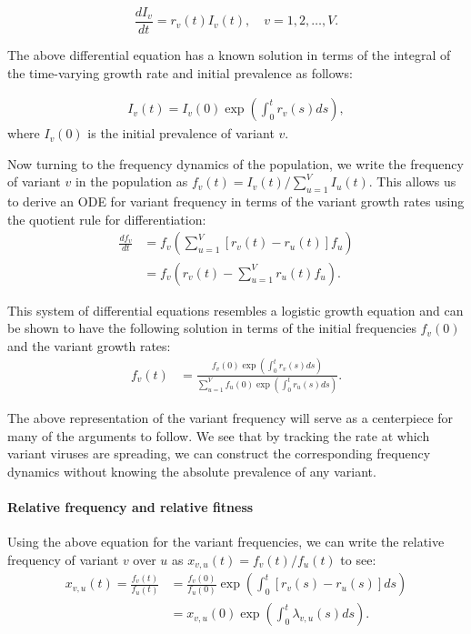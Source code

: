 \documentclass[11pt,oneside,letterpaper]{article}
\begin{document}
\begin{equation} \label{eq:inhomo_exp_growth}
    \frac{d I_{v}}{d t} = r_{v}(t) I_{v}(t), \quad v = 1,2, \ldots, V.
\end{equation}

The above differential equation has a known solution in terms of the integral of the time-varying growth rate and initial prevalence as follows:

\begin{align*}
I_{v}(t) = I_{v}(0) \exp\left( \int_{0}^{t} r_{v}(s) ds\right),
\end{align*}
where $I_{v}(0)$ is the initial prevalence of variant $v$.

Now turning to the frequency dynamics of the population, we write the frequency of variant $v$ in the population as  $f_{v}(t) = I_{v}(t) / \sum_{u=1}^{V} I_{u}(t)$.
This allows us to derive an ODE for variant frequency in terms of the variant growth rates using the quotient rule for differentiation:
\begin{align*}
    \frac{d f_{v}}{d t} &= f_{v} \left( \sum_{u=1}^{V} [r_{v}(t) - r_{u}(t)] f_{u} \right)\\
                        &= f_{v} \left( r_{v}(t) - \sum_{u=1}^{V} r_{u}(t) f_{u} \right).
\end{align*}

This system of differential equations resembles a logistic growth equation and can be shown to have the following solution in terms of the initial frequencies $f_{v}(0)$ and the variant growth rates:
\begin{align}
    f_{v}(t) &= \frac{ f_{v}(0) \exp( \int_{0}^{t} r_{v}(s) ds)}{\sum_{u=1}^{V}  f_{u}(0) \exp( \int_{0}^{t} r_{u}(s) ds)}.
\end{align}

The above representation of the variant frequency will serve as a centerpiece for many of the arguments to follow.
We see that by tracking the rate at which variant viruses are spreading, we can construct the corresponding frequency dynamics without knowing the absolute prevalence of any variant.

\paragraph{Relative frequency and relative fitness}%

Using the above equation for the variant frequencies, we can write the relative frequency of variant $v$ over $u$ as $x_{v,u}(t) = f_{v}(t) / f_{u}(t)$ to see:
\begin{align*}
    x_{v, u}(t) = \frac{f_{v}(t)}{f_{u}(t)} &= \frac{f_{v}(0)}{f_{u}(0)} \exp \left( \int_{0}^{t} [r_{v}(s) - r_{u}(s)] ds \right)\\
                                            &=x_{v,u}(0)\exp \left( \int_{0}^{t} \lambda_{v,u}(s) ds \right).
\end{align*}
\end{document}
